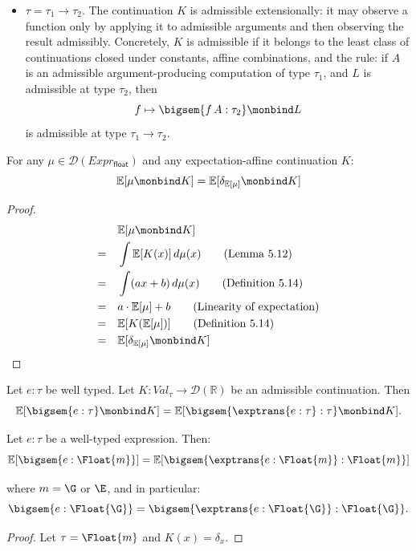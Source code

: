 \begin{definition}
\begin{itemize}
    \item $\tau = \tau_1 \to \tau_2$. The continuation $K$ is admissible
    extensionally: it may observe a function only by applying it to admissible
    arguments and then observing the result admissibly. Concretely, $K$ is
    admissible if it belongs to the least class of continuations closed under
    constants, affine combinations, and the rule:
    if $A$ is an admissible argument-producing computation of type
    $\tau_1$, and $L$ is admissible at type $\tau_2$, then
    \[
      f \mapsto \bigsem{f\,A : \tau_2} \monbind L
    \]
    is admissible at type $\tau_1 \to \tau_2$.
  \end{itemize}
\end{definition}


\begin{lemma}
  For any $\mu \in \mathcal{D}(Expr_\mathsf{float})$ and any expectation-affine continuation $K$:
  \[
    \mathbb{E}[\mu \monbind K] = \mathbb{E}[\delta_{\mathbb{E}[\mu]} \monbind K]
  \]
\end{lemma}

\begin{proof}
  \begin{align*}
    &\mathbb{E}[\mu \monbind K] \\
    = \quad&\int \mathbb{E}[K(x)] \, d\mu(x) \tag{Lemma 5.12} \\
    = \quad&\int (ax + b) \, d\mu(x) \tag{Definition 5.14} \\
    = \quad&a \cdot \mathbb{E}[\mu] + b \tag{Linearity of expectation} \\
    = \quad&\mathbb{E}[K(\mathbb{E}[\mu])] \tag{Definition 5.14} \\
    = \quad&\mathbb{E}[\delta_{\mathbb{E}[\mu]} \monbind K] 
  \end{align*}
\end{proof}

\begin{theorem}
  Let $e : \tau$ be well typed. Let
  $K : Val_\tau \to \mathcal{D}(\mathbb{R})$
  be an admissible continuation. Then
  \[
    \mathbb{E}[\bigsem{e : \tau} \monbind K]
    =
    \mathbb{E}[\bigsem{\exptrans{e : \tau} : \tau} \monbind K].
  \]
\end{theorem}

\begin{theorem}
  Let $e : \tau$ be a well-typed expression. Then:
  \[
    \mathbb{E}[\bigsem{e : \Float{m}}]
    =
    \mathbb{E}[\bigsem{\exptrans{e : \Float{m}} : \Float{m}}]
  \]

  where $m = \G$ or $\E$, and in particular:
  \[
    \bigsem{e : \Float{\G}}
    =
    \bigsem{\exptrans{e : \Float{\G}} : \Float{\G}}.
  \]
\end{theorem}

\begin{proof}
  Let $\tau = \Float{m}$ and $K(x) = \delta_x$. 
\end{proof}
